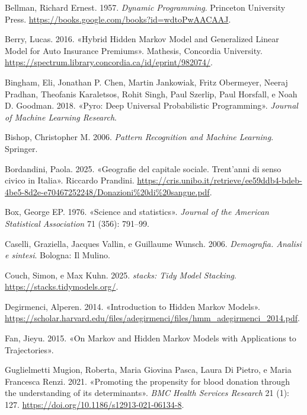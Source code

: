 \documentclass[
  italian,
  a4paper,
  a4paper,
  twoside,
  open=right,
  12pt]{scrbook}
\newlength{\cslhangindent}
\newenvironment{CSLReferences}[2] %
 {\begin{list}{}{%
  \setlength{\itemindent}{0pt}
  \setlength{\leftmargin}{0pt}
  \setlength{\parsep}{0pt}
  \ifodd #1
   \setlength{\leftmargin}{\cslhangindent}
   \setlength{\itemindent}{-1\cslhangindent}
  \fi
  \setlength{\itemsep}{#2\baselineskip}}}
 {\end{list}}
\theoremstyle{definition}
\theoremstyle{remark}
\begin{document}
\label{refs}
\begin{CSLReferences}{1}{0}
Bellman, Richard Ernest. 1957. \emph{Dynamic Programming}. Princeton
University Press. \url{https://books.google.com/books?id=wdtoPwAACAAJ}.

Berry, Lucas. 2016. {«Hybrid Hidden Markov Model and Generalized Linear
Model for Auto Insurance Premiums»}. Mathesis, Concordia University.
\url{https://spectrum.library.concordia.ca/id/eprint/982074/}.

Bingham, Eli, Jonathan P. Chen, Martin Jankowiak, Fritz Obermeyer,
Neeraj Pradhan, Theofanis Karaletsos, Rohit Singh, Paul Szerlip, Paul
Horsfall, e Noah D. Goodman. 2018. {«{Pyro: Deep Universal Probabilistic
Programming}»}. \emph{Journal of Machine Learning Research}.

Bishop, Christopher M. 2006. \emph{Pattern Recognition and Machine
Learning}. Springer.

Bordandini, Paola. 2025. {«Geografie del capitale sociale. Trent'anni di
senso civico in Italia»}. Riccardo Prandini.
\url{https://cris.unibo.it/retrieve/ee59ddb4-bdeb-4be5-8d2e-e70467252248/Donazioni\%20di\%20sangue.pdf}.

Box, George EP. 1976. {«Science and statistics»}. \emph{Journal of the
American Statistical Association} 71 (356): 791--99.

Caselli, Graziella, Jacques Vallin, e Guillaume Wunsch. 2006.
\emph{Demografia. Analisi e sintesi}. Bologna: Il Mulino.

Couch, Simon, e Max Kuhn. 2025. \emph{stacks: Tidy Model Stacking}.
\url{https://stacks.tidymodels.org/}.

Degirmenci, Alperen. 2014. {«Introduction to Hidden Markov Models»}.
\url{https://scholar.harvard.edu/files/adegirmenci/files/hmm_adegirmenci_2014.pdf}.

Fan, Jieyu. 2015. {«On Markov and Hidden Markov Models with Applications
to Trajectories»}.

Guglielmetti Mugion, Roberta, Maria Giovina Pasca, Laura Di Pietro, e
Maria Francesca Renzi. 2021. {«Promoting the propensity for blood
donation through the understanding of its determinants»}. \emph{BMC
Health Services Research} 21 (1): 127.
\url{https://doi.org/10.1186/s12913-021-06134-8}.


\end{CSLReferences}
\end{document}
